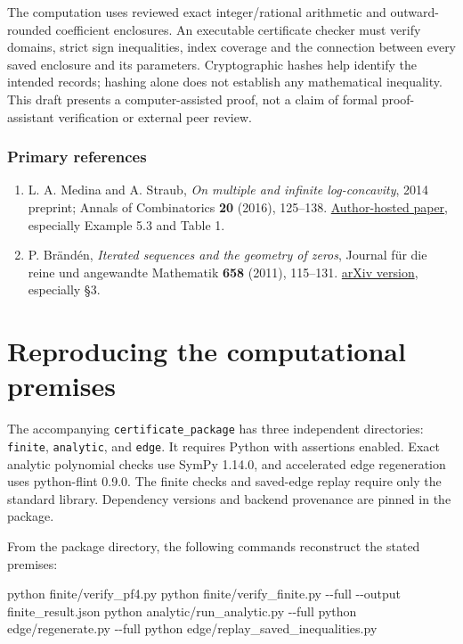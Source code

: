 \documentclass[
  11pt,
]{article}
\newenvironment{Shaded}{}{}
\newcommand{\AttributeTok}[1]{\textcolor[rgb]{0.49,0.56,0.16}{#1}}
\newcommand{\ExtensionTok}[1]{#1}
\newcommand{\NormalTok}[1]{#1}
\providecommand{\tightlist}{%
  \setlength{\itemsep}{0pt}\setlength{\parskip}{0pt}}
\begin{document}
The computation uses reviewed exact integer/rational arithmetic and
outward-rounded coefficient enclosures. An executable certificate
checker must verify domains, strict sign inequalities, index coverage
and the connection between every saved enclosure and its parameters.
Cryptographic hashes help identify the intended records; hashing alone
does not establish any mathematical inequality. This draft presents a
computer-assisted proof, not a claim of formal proof-assistant
verification or external peer review.

\subsubsection{Primary references}\label{primary-references}

\begin{enumerate}
\def\labelenumi{\arabic{enumi}.}
\tightlist
\item
  L. A. Medina and A. Straub, \emph{On multiple and infinite
  log-concavity}, 2014 preprint; Annals of Combinatorics \textbf{20}
  (2016), 125--138.
  \href{https://arminstraub.com/downloads/pub/infinitelogconcavity.pdf}{Author-hosted
  paper}, especially Example 5.3 and Table 1.
\item
  P. Brändén, \emph{Iterated sequences and the geometry of zeros},
  Journal für die reine und angewandte Mathematik \textbf{658} (2011),
  115--131. \href{https://arxiv.org/pdf/0909.1927}{arXiv version},
  especially §3.
\end{enumerate}

\clearpage

\section{Reproducing the computational
premises}\label{reproducing-the-computational-premises}

The accompanying \texttt{certificate\_package} has three independent
directories: \texttt{finite}, \texttt{analytic}, and \texttt{edge}. It
requires Python with assertions enabled. Exact analytic polynomial
checks use SymPy 1.14.0, and accelerated edge regeneration uses
python-flint 0.9.0. The finite checks and saved-edge replay require only
the standard library. Dependency versions and backend provenance are
pinned in the package.

From the package directory, the following commands reconstruct the
stated premises:

\begin{Shaded}
\begin{Highlighting}[]
\ExtensionTok{python}\NormalTok{ finite/verify\_pf4.py}
\ExtensionTok{python}\NormalTok{ finite/verify\_finite.py }\AttributeTok{{-}{-}full} \AttributeTok{{-}{-}output}\NormalTok{ finite\_result.json}
\ExtensionTok{python}\NormalTok{ analytic/run\_analytic.py }\AttributeTok{{-}{-}full}
\ExtensionTok{python}\NormalTok{ edge/regenerate.py }\AttributeTok{{-}{-}full}
\ExtensionTok{python}\NormalTok{ edge/replay\_saved\_inequalities.py}
\end{Highlighting}
\end{Shaded}
\end{document}
